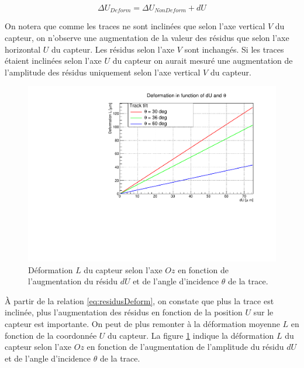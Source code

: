   \begin{equation}
   \Delta U_{Deform} = \Delta U_{Non Deform} + dU
  \end{equation}
  
  On notera que comme les traces ne sont inclin\'ees que selon l'axe vertical $V$ du capteur, on n'observe une augmentation de la valeur des r\'esidus que selon l'axe horizontal $U$ du capteur. Les r\'esidus selon l'axe $V$ sont inchang\'es. Si les traces \'etaient inclin\'ees selon l'axe $U$ du capteur on aurait mesur\'e une augmentation de l'amplitude des r\'esidus uniquement selon l'axe vertical $V$ du capteur. 

  \begin{figure}[!htb]
   \begin{center} 
    \includegraphics[scale=0.50]{./figures/PLUME_deformations/Deformations_theta.pdf}
    \caption{D\'eformation $L$ du capteur selon l'axe $Oz$ en fonction de l'augmentation du r\'esidu $dU$ et de l'angle d'incidence $\theta$ de la trace.}
    \label{fig:DeformationsTheta}
   \end{center}
  \end{figure}
  
  \medskip
  
  \`A partir de la relation \ref{eq:residusDeform}, on constate que plus la trace est inclin\'ee, plus l'augmentation des r\'esidus en fonction de la position $U$ sur le capteur est importante. On peut de plus remonter \`a la d\'eformation moyenne $L$ en fonction de la coordonn\'ee $U$ du capteur. La figure \ref{fig:DeformationsTheta} indique la d\'eformation $L$ du capteur selon l'axe $Oz$ en fonction de l'augmentation de l'amplitude du r\'esidu $dU$ et de l'angle d'incidence $\theta$ de la trace.
  
